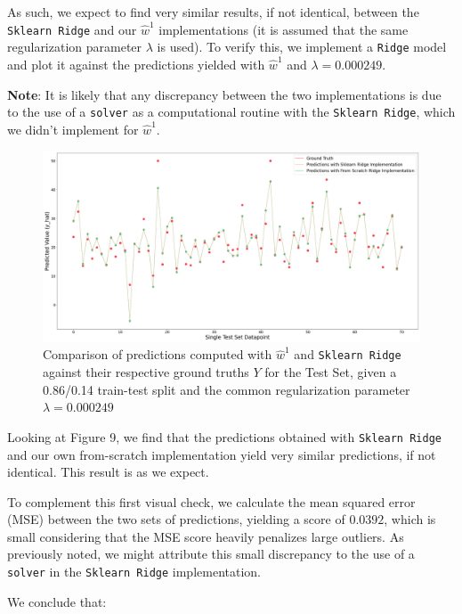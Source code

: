\documentclass{homework}
\begin{document}
As such, we expect to find very similar results, if not identical, between the \texttt{Sklearn Ridge} and our $\hat{w}^1$ implementations (it is assumed
that the same regularization parameter $\lambda$ is used). To verify this, we implement a \texttt{Ridge} model and plot it 
against the predictions yielded with $\hat{w}^1$ and $\lambda=0.000249$.

\textbf{Note}: It is likely that any discrepancy between the two implementations is due to the use of a \texttt{solver} as 
a computational routine with the \texttt{Sklearn Ridge}, which we didn't implement for $\hat{w}^1$.

\begin{figure}[H]
\begin{center}
\includegraphics[width=\textwidth]{images/ridge_Sklearn_vs_fromscratch.png}
\end{center}
\caption{Comparison of predictions computed with $\hat{w}^1$ and \texttt{Sklearn Ridge} against their respective ground truths $Y$ for the Test Set, given a 0.86/0.14 train-test split and the common regularization parameter $\lambda=0.000249$}
\end{figure}

Looking at Figure 9, we find that the predictions obtained with \texttt{Sklearn Ridge} and our own from-scratch implementation 
yield very similar predictions, if not identical. This result is as we expect.

To complement this first visual check, we calculate the mean squared error (MSE) between the two sets of predictions, yielding a score 
of $0.0392$, which is small considering that the MSE score heavily penalizes large outliers. As previously noted, we might attribute this
small discrepancy to the use of a \texttt{solver} in the \texttt{Sklearn Ridge} implementation.

We conclude that:
\end{document}
